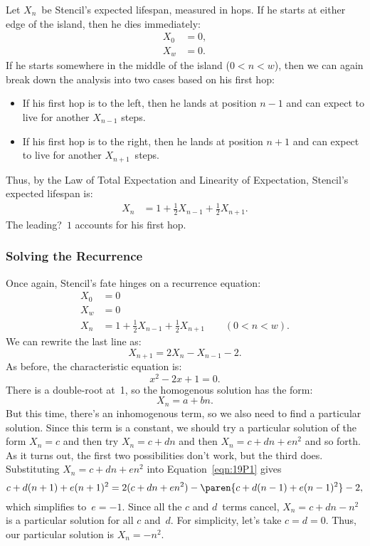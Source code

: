 Let $X_n$~be Stencil's expected lifespan, measured in hops.  If he
starts at either edge of the island, then he dies immediately:
%
\begin{align*}
X_0 & = 0, \\
X_w & = 0.
\end{align*}
%
If he starts somewhere in the middle of the island ($0 < n < w$), then
we can again break down the analysis into two cases based on his first
hop:
%
\begin{itemize}

\item

If his first hop is to the left, then he lands at position $n-1$ and
can expect to live for another $X_{n-1}$ steps.

\item

If his first hop is to the right, then he lands at position $n+1$ and
can expect to live for another $X_{n+1}$~steps.

\end{itemize}
%
Thus, by the Law of Total Expectation and Linearity of Expectation,
Stencil's expected lifespan is:
%
\begin{align*}
    X_n & = 1 + \frac{1}{2} X_{n-1} + \frac{1}{2} X_{n+1}.
\end{align*}
%
The leading?~$1$ accounts for his first hop.

\subsubsection{Solving the Recurrence}

Once again, Stencil's fate hinges on a recurrence equation:
%
\[
\begin{array}{rl}
X_0 & = 0 \\
X_w & = 0 \\
X_n & = 1 + \frac{1}{2} X_{n-1} + \frac{1}{2} X_{n+1} \qquad (0 < n < w).
\end{array}
\]
%
We can rewrite the last line as:
%
\begin{equation}\label{eqn:19P1}
    X_{n+1} = 2 X_n - X_{n-1} - 2.
\end{equation}
%
As before, the characteristic equation is:
%
\[
    x^2 - 2 x + 1 = 0.
\]
%
There is a double-root at~1, so the homogenous solution has the form:
%
\[
    X_n = a + b n.
\]
%
But this time, there's an inhomogenous term, so we also need to find a
particular solution.  Since this term is a constant, we should try a
particular solution of the form $X_n = c$ and then try $X_n = c + d n$
and then $X_n = c + d n + e n^2$ and so forth.  As it turns out, the
first two possibilities don't work, but the third does.  Substituting
$X_n = c + d n + e n^2$ into Equation~\ref{eqn:19P1} gives
%
\begin{equation*}
c + d(n+1) + e(n+1)^2 = 2 (c + dn + en^2)
    - \paren{c + d(n-1) + e(n-1)^2} - 2,
\end{equation*}
which simplifies to~$e = -1$.  Since all the $c$ and $d$~terms cancel,
$X_n = c + d n - n^2$ is a particular solution for all $c$ and~$d$.
For simplicity, let's take $c = d = 0$.  Thus, our particular solution
is $X_n = - n^2$.

